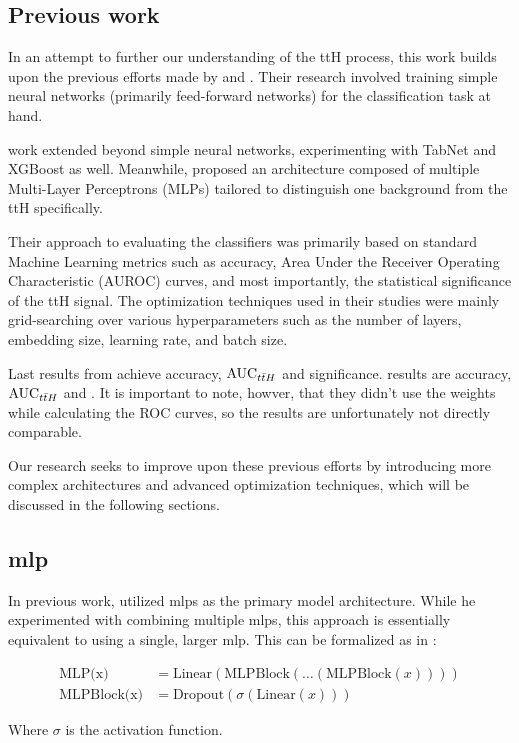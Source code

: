 \subsection{Previous work}

In an attempt to further our understanding of the ttH process, this work builds upon the previous efforts made by
\severin and \jan. Their research involved training simple neural networks
(primarily feed-forward networks) for the classification task at hand.

\jan work extended beyond simple neural networks, experimenting with TabNet and XGBoost as well. Meanwhile, \severin
proposed an architecture composed of multiple Multi-Layer Perceptrons (MLPs) tailored to distinguish one background from
the ttH specifically.

Their approach to evaluating the classifiers was primarily based on standard Machine Learning metrics such as accuracy,
Area Under the Receiver Operating Characteristic (AUROC) curves, and most importantly, the statistical significance of
the ttH signal. The optimization techniques used in their studies were mainly grid-searching over various
hyperparameters such as the number of layers, embedding size, learning rate, and batch size.

Last results from \severin achieve  accuracy,  $\text{AUC}_{t\bar{t}H}$ and 
significance. \jan results are  accuracy,  $\text{AUC}_{t\bar{t}H}$ and .
It is important to note, howver, that they didn't use the weights while calculating the ROC curves, so the results are
unfortunately not directly comparable.

Our research seeks to improve upon these previous efforts by introducing more complex architectures and advanced
optimization techniques, which will be discussed in the following sections.

\subsection[MLP]{\gls{mlp}}

In previous work, \severin utilized \glspl{mlp} as the primary model architecture.
While he experimented with combining multiple \glspl{mlp}, this approach is essentially equivalent to using a single,
larger \gls{mlp}. This can be formalized as in \cite{ft-transformer}:

\begin{align}
    \text{MLP(x)}      & = \text{Linear}(\text{MLPBlock}(\dots(\text{MLPBlock}(x)))) \\
    \text{MLPBlock(x)} & = \text{Dropout}(\sigma(\text{Linear}(x)))
\end{align}

Where $\sigma$ is the activation function.


